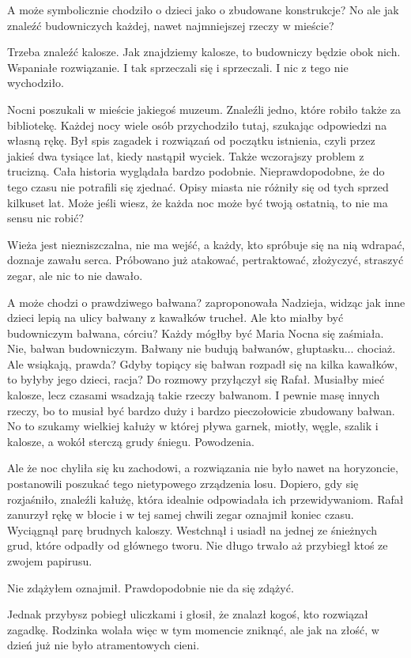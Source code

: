 A może symbolicznie chodziło o dzieci jako o zbudowane konstrukcje? 
No ale jak znaleźć budowniczych każdej, nawet najmniejszej rzeczy w mieście?

Trzeba znaleźć kalosze. Jak znajdziemy kalosze, to budowniczy będzie obok nich. Wspaniałe rozwiązanie.
I tak sprzeczali się i sprzeczali.
I nic z tego nie wychodziło.


Nocni poszukali w mieście jakiegoś muzeum.
Znaleźli jedno, które robiło także za bibliotekę.
Każdej nocy wiele osób przychodziło tutaj, szukając odpowiedzi na własną rękę.
Był spis zagadek i rozwiązań od początku istnienia, czyli przez jakieś dwa tysiące lat, kiedy nastąpił wyciek.
Także wczorajszy problem z trucizną. Cała historia wyglądała bardzo podobnie.
Nieprawdopodobne, że do tego czasu nie potrafili się zjednać.
Opisy miasta nie różniły się od tych sprzed kilkuset lat.
Może jeśli wiesz, że każda noc może być twoją ostatnią, to nie ma sensu nic robić?

Wieża jest niezniszczalna, nie ma wejść, a każdy, kto spróbuje się na nią wdrapać, doznaje zawału serca.
Próbowano już atakować, pertraktować, złożyczyć, straszyć zegar, ale nic to nie dawało.

\begin{dialogue}
	\ds{} A może chodzi o prawdziwego bałwana? \dm{} zaproponowała Nadzieja, widząc jak inne dzieci lepią na ulicy bałwany z kawałków trucheł.
	\ds{} Ale kto miałby być budowniczym bałwana, córciu? Każdy mógłby być \dm{} Maria Nocna się zaśmiała.
	\ds{} Nie, bałwan budowniczym.
	\ds{} Bałwany nie budują bałwanów, głuptasku... chociaż.
	\ds{} Ale wsiąkają, prawda?
	\ds{} Gdyby topiący się bałwan rozpadł się na kilka kawałków, to byłyby jego dzieci, racja? \dm{} Do rozmowy przyłączył się Rafał.
	\ds{} Musiałby mieć kalosze, lecz czasami wsadzają takie rzeczy bałwanom.
	\ds{} I pewnie masę innych rzeczy, bo to musiał być bardzo duży i bardzo pieczołowicie zbudowany bałwan.
	\ds{} No to szukamy wielkiej kałuży w której pływa garnek, miotły, węgle, szalik i kalosze, a wokół sterczą grudy śniegu. Powodzenia.
\end{dialogue}

Ale że noc chyliła się ku zachodowi, a rozwiązania nie było nawet na horyzoncie, postanowili poszukać tego nietypowego zrządzenia losu.
Dopiero, gdy się rozjaśniło, znaleźli kałużę, która idealnie odpowiadała ich przewidywaniom.
Rafał zanurzył rękę w błocie i w tej samej chwili zegar oznajmił koniec czasu.
Wyciągnął parę brudnych kaloszy.
Westchnął i usiadł na jednej ze śnieżnych grud, które odpadły od głównego tworu.
Nie długo trwało aż przybiegł ktoś ze zwojem papirusu.
\begin{dialogue}
	\ds{} Nie zdążyłem \dm{} oznajmił. \dm{} Prawdopodobnie nie da się zdążyć.
\end{dialogue}
Jednak przybysz pobiegł uliczkami i głosił, że znalazł kogoś, kto rozwiązał zagadkę.
Rodzinka wolała więc w tym momencie zniknąć, ale jak na złość, w dzień już nie było atramentowych cieni.

